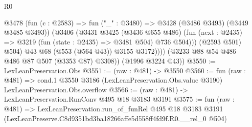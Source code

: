 \begin{lexlean}{R0}
\begin{coremodule}
                @3478
                  (fun (c : @2583) => fun ("_" : @3480) => @3428 (@3486 @3493) (@3449 @3485 @3493))
                  (@3406
                    (@3431
                      @3425
                      (@3436 @655 @486)
                      (fun (next : @2435) => @3219 (fun (state : @2435) => @3481 @504) @736 @504)))
                  (@2593 @501)
                  @504)
                @43
                @68
                (@553 (@564 @43))
                @3155
                @3172))))
        (@3233 @88 @54 @486 @486 @87 @507 (@3353 @87) @3308))
      (@1996 @3224 @43))
@3550 := LexLeanPreservation.Obs
@3551 := (raw : @481) -> @3550
@3560 := fun (raw : @481) =>
  cond.{1} @3550 @3186 (LexLeanPreservation.Obs.value @3190) LexLeanPreservation.Obs.overflow
@3566 := (raw : @481) -> LexLeanPreservation.RunConv @495 @18 @3183 @3191
@3575 := fun (raw : @481) =>
  LexLeanPreservation.run_of_funRel
    @495
    @18
    @3183
    @3191
    (LexLeanPreserve.C8d9351bd3ba18266affe5d558ff4fd9f.R0.__rel_0 @504)
\end{coremodule}
\end{lexlean}
